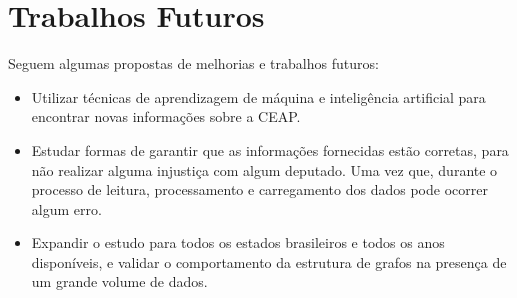 \section{Trabalhos Futuros}

	Seguem algumas propostas de melhorias e trabalhos futuros:
	
	\begin{itemize}
		\item Utilizar técnicas de aprendizagem de máquina e inteligência artificial para encontrar novas informações sobre a CEAP.
		\item Estudar formas de garantir que as informações fornecidas estão corretas, para não realizar alguma injustiça com algum deputado. Uma vez que, durante o processo de leitura, processamento e carregamento dos dados pode ocorrer algum erro.
		\item Expandir o estudo para todos os estados brasileiros e todos os anos disponíveis, e validar o comportamento da estrutura de grafos na presença de um grande volume de dados.
	\end{itemize}